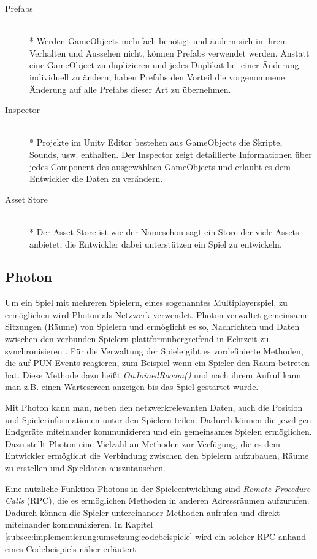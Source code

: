\begin{description}
    \item[Prefabs] \hfill \\* Werden GameObjects mehrfach benötigt und ändern sich in ihrem Verhalten und Aussehen nicht, können Prefabs verwendet werden. Anstatt eine GameObject zu duplizieren und jedes Duplikat bei einer Änderung individuell zu ändern, haben Prefabs den Vorteil die vorgenommene Änderung auf alle Prefabs dieser Art zu übernehmen.
    \item[Inspector] \hfill \\* Projekte im Unity Editor bestehen aus GameObjects die Skripte, Sounds, usw. enthalten. Der Inspector zeigt detaillierte Informationen über jedes Component des ausgewählten GameObjects und erlaubt es dem Entwickler die Daten zu verändern.
    \item[Asset Store] \hfill \\* Der Asset Store ist wie der Nameschon sagt ein Store der viele Assets anbietet, die Entwickler dabei unterstützen ein Spiel zu entwickeln.
\end{description}


\subsection{Photon}
\label{subsec:realisierung:technologien:photon}
Um ein Spiel mit mehreren Spielern, eines sogenanntes Multiplayerspiel, zu ermöglichen wird Photon als Netzwerk verwendet. Photon verwaltet gemeinsame Sitzungen (Räume) von Spielern und ermöglicht es so, Nachrichten und Daten zwischen den verbunden Spielern plattformübergreifend in Echtzeit zu synchronisieren \cite{photon}. Für die Verwaltung der Spiele gibt es vordefinierte Methoden, die auf PUN-Events reagieren, zum Beispiel wenn ein Spieler den Raum betreten hat. Diese Methode dazu heißt \textit{OnJoinedRooom()} und nach ihrem Aufruf kann man z.B. einen Wartescreen anzeigen bis das Spiel gestartet wurde.

Mit Photon kann man, neben den netzwerkrelevanten Daten, auch die Position und Spielerinformationen unter den Spielern teilen. Dadurch können die jewiligen Endgeräte miteinander kommunizieren und ein gemeinsames Spielen ermöglichen. Dazu stellt Photon eine Vielzahl an Methoden zur Verfügung, die es dem Entwickler ermöglicht die Verbindung zwischen den Spielern aufzubauen, Räume zu erstellen und Spieldaten auszutauschen.

Eine nützliche Funktion Photons in der Spieleentwicklung sind \textit{Remote Procedure Calls} (RPC), die es ermöglichen Methoden in anderen Adressräumen aufzurufen. Dadurch können die Spieler untereinander Methoden aufrufen und direkt miteinander kommunizieren. In Kapitel \ref{subsec:implementierung:umsetzung:codebeispiele} wird ein solcher RPC anhand eines Codebeispiels näher erläutert.

